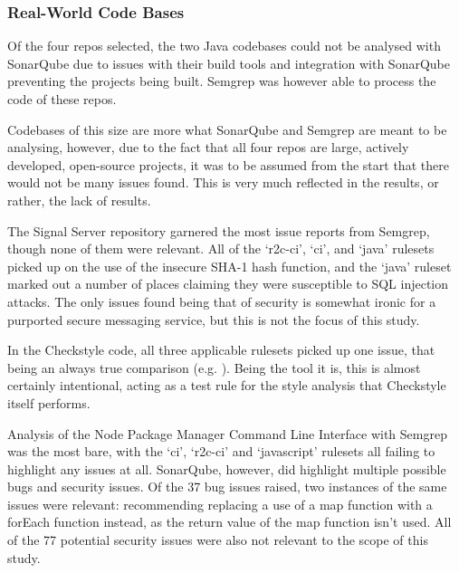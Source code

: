 \documentclass{article}
\begin{document}
        \subsubsection{Real-World Code Bases}
        \label{subsubsec:staticAnalysisRepos}
            Of the four repos selected, the two Java codebases could not be analysed with SonarQube due to issues with their build tools and integration with SonarQube preventing the projects being built. Semgrep was however able to process the code of these repos.

            Codebases of this size are more what SonarQube and Semgrep are meant to be analysing, however, due to the fact that all four repos are large, actively developed, open-source projects, it was to be assumed from the start that there would not be many issues found. This is very much reflected in the results, or rather, the lack of results.

            The Signal Server repository garnered the most issue reports from Semgrep, though none of them were relevant. All of the `r2c-ci', `ci', and `java' rulesets picked up on the use of the insecure SHA-1 hash function, and the `java' ruleset marked out a number of places claiming they were susceptible to SQL injection attacks. The only issues found being that of security is somewhat ironic for a purported secure messaging service, but this is not the focus of this study.

            In the Checkstyle code, all three applicable rulesets picked up one issue, that being an always true comparison (e.g. ). Being the tool it is, this is almost certainly intentional, acting as a test rule for the style analysis that Checkstyle itself performs.

            Analysis of the Node Package Manager Command Line Interface with Semgrep was the most bare, with the `ci', `r2c-ci' and `javascript' rulesets all failing to highlight any issues at all. SonarQube, however, did highlight multiple possible bugs and security issues. Of the 37 bug issues raised, two instances of the same issues were relevant: recommending replacing a use of a map function with a forEach function instead, as the return value of the map function isn't used. All of the 77 potential security issues were also not relevant to the scope of this study.
\end{document}
